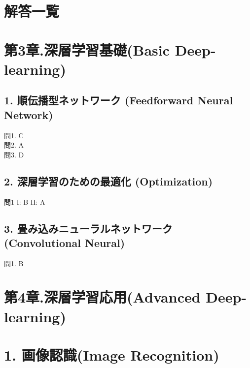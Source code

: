 \documentclass[
  letterpaper,
  DIV=11,
  numbers=noendperiod]{scrreprt}
\begin{document}
\chapter{解答一覧}\label{ux89e3ux7b54ux4e00ux89a7}


\chapter{第3章.深層学習基礎(Basic
Deep-learning)}\label{ux7b2c3ux7ae0.ux6df1ux5c64ux5b66ux7fd2ux57faux790ebasic-deep-learning}

\section{1. 順伝播型ネットワーク (Feedforward Neural
Network)}\label{ux9806ux4f1dux64adux578bux30cdux30c3ux30c8ux30efux30fcux30af-feedforward-neural-network-1}

問1. C\\
問2. A\\
問3. D

\section{2. 深層学習のための最適化
(Optimization)}\label{ux6df1ux5c64ux5b66ux7fd2ux306eux305fux3081ux306eux6700ux9069ux5316-optimization-1}

問1 I: B II: A

\section{3. 畳み込みニューラルネットワーク (Convolutional
Neural)}\label{ux7573ux307fux8fbcux307fux30cbux30e5ux30fcux30e9ux30ebux30cdux30c3ux30c8ux30efux30fcux30af-convolutional-neural-1}

問1. B


\chapter{第4章.深層学習応用(Advanced
Deep-learning)}\label{ux7b2c4ux7ae0.ux6df1ux5c64ux5b66ux7fd2ux5fdcux7528advanced-deep-learning-1}


\chapter{1. 画像認識(Image
Recognition)}\label{ux753bux50cfux8a8dux8b58image-recognition-1}
\end{document}

